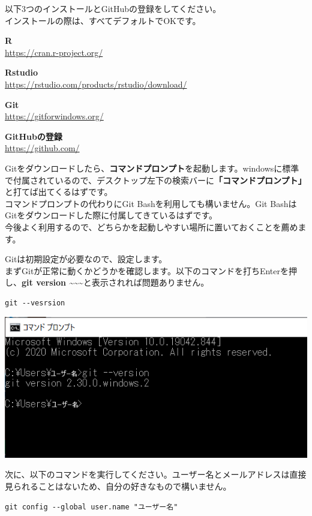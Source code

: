 \documentclass[
]{book}
\begin{document}
以下3つのインストールとGitHubの登録をしてください。\\
インストールの際は、すべてデフォルトでOKです。

\textbf{R}\\
\url{https://cran.r-project.org/}

\textbf{Rstudio}\\
\url{https://rstudio.com/products/rstudio/download/}

\textbf{Git}\\
\url{https://gitforwindows.org/}

\textbf{GitHubの登録}\\
\url{https://github.com/}

Gitをダウンロードしたら、\textbf{コマンドプロンプト}を起動します。windowsに標準で付属されているので、デスクトップ左下の検索バーに\textbf{「コマンドプロンプト」}と打てば出てくるはずです。\\
コマンドプロンプトの代わりにGit Bashを利用しても構いません。Git BashはGitをダウンロードした際に付属してきているはずです。\\
今後よく利用するので、どちらかを起動しやすい場所に置いておくことを薦めます。

Gitは初期設定が必要なので、設定します。\\
まずGitが正常に動くかどうかを確認します。以下のコマンドを打ちEnterを押し、\textbf{git version \textasciitilde\textasciitilde\textasciitilde{}}と表示されれば問題ありません。

\begin{verbatim}
git --vesrsion
\end{verbatim}

\includegraphics{pics/git_version.png}

次に、以下のコマンドを実行してください。ユーザー名とメールアドレスは直接見られることはないため、自分の好きなもので構いません。

\begin{verbatim}
git config --global user.name "ユーザー名"
\end{verbatim}
\end{document}
